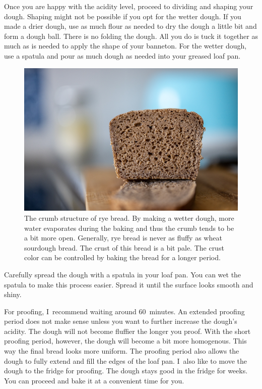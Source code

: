 Once you are happy with the acidity level, proceed to dividing
and shaping your dough. Shaping might not be possible if you opt
for the wetter dough. If you made a drier dough, use as much
flour as needed to dry the dough a little bit and form a dough ball.
There is no folding the dough. All you do is tuck it together
as much as is needed to apply the shape of your banneton.
For the wetter dough, use a spatula and pour as much dough as
needed into your greased loaf pan.

\begin{figure}[!htb]
  \includegraphics[width=\textwidth]{crumb}
  \caption[Rye bread]{The crumb structure of rye bread. By making a wetter
  dough, more water evaporates during the baking and thus the
  crumb tends to be a bit more open. Generally, rye
  bread is never as fluffy as wheat sourdough bread. The crust
  of this bread is a bit pale. The crust color can be controlled
  by baking the bread for a longer period.}%
  \label{fig:rye-crumb}
\end{figure}

Carefully spread the dough with a spatula in your loaf pan. You
can wet the spatula to make this process easier. Spread it
until the surface looks smooth and shiny.

For proofing, I~recommend waiting around 60~minutes. An extended
proofing period does not make sense unless you want to further
increase the dough's acidity. The dough will not become fluffier
the longer you proof. With the short proofing period, however,
the dough will become a bit more homogenous. This way the final
bread looks more uniform. The proofing period also allows the
dough to fully extend and fill the edges of the loaf pan. I~also
like to move the dough to the fridge for proofing. The dough stays
good in the fridge for weeks. You can proceed and bake it at a
convenient time for you. 

